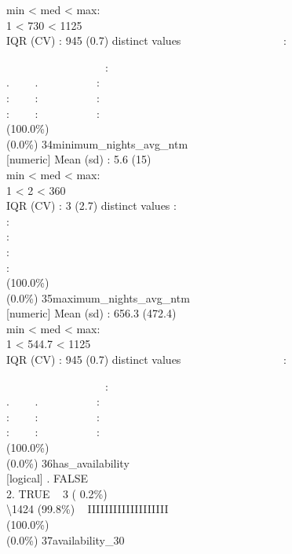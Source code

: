 \documentclass[
  journal,
]{IEEEtran}%
\begin{document}
min \textless{} med \textless{} max:\\
1 \textless{} 730 \textless{} 1125\\
IQR (CV) : 945 (0.7)  distinct values \textbar{}
\textbar~~~~~~~~~~~~~~~~~~:\\
\strut ~~~~~~~~~~~~~~~~~~:\\
. ~~~~. ~~~~~~~~~~:\\
: ~~~~: ~~~~~~~~~~:\\
: ~~~~: ~~~~~~~~~~: \\
(100.0\%) \\
(0.0\%) \textbar{} \textbar{} 34\textbar minimum\_nights\_avg\_ntm\\
{[}numeric{]} \textbar Mean (sd) : 5.6 (15)\\
min \textless{} med \textless{} max:\\
1 \textless{} 2 \textless{} 360\\
IQR (CV) : 3 (2.7)  distinct values \textbar{} \textbar:\\
:\\
:\\
:\\
: \\
(100.0\%) \\
(0.0\%) \textbar{} \textbar{} 35\textbar maximum\_nights\_avg\_ntm\\
{[}numeric{]} \textbar Mean (sd) : 656.3 (472.4)\\
min \textless{} med \textless{} max:\\
1 \textless{} 544.7 \textless{} 1125\\
IQR (CV) : 945 (0.7)  distinct values \textbar{}
\textbar~~~~~~~~~~~~~~~~~~:\\
\strut ~~~~~~~~~~~~~~~~~~:\\
. ~~~~. ~~~~~~~~~~:\\
: ~~~~: ~~~~~~~~~~:\\
: ~~~~: ~~~~~~~~~~: \\
(100.0\%) \\
(0.0\%) \textbar{} \textbar{} 36\textbar has\_availability\\
{[}logical{]} . FALSE\\
2. TRUE \textbar~ 3 ( 0.2\%)\\
\textbackslash1424 (99.8\%) \textbar{} \textbar~ IIIIIIIIIIIIIIIIIII
\\
(100.0\%) \\
(0.0\%) \textbar{} \textbar{} 37\textbar availability\_30\\
\end{document}
